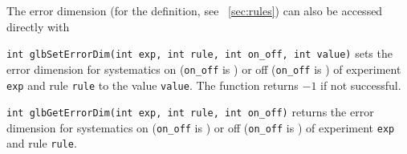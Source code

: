 The error dimension (for the definition, see \Sec~\ref{sec:rules}) can also be accessed directly with 
\begin{function}
{\tt int glbSetErrorDim(int exp, int rule, int on\_off, int value)}
sets the error dimension for systematics on ({\tt on\_off} is ) or off ({\tt on\_off} is ) of experiment {\tt exp} and rule {\tt rule} to the value {\tt value}. The function returns
$-1$ if not successful.
\end{function}
\begin{function}
{\tt int glbGetErrorDim(int exp, int rule, int on\_off)}
returns the error dimension for systematics on ({\tt on\_off} is ) or off ({\tt on\_off} is ) of experiment {\tt exp} and rule {\tt rule}.
\end{function}

